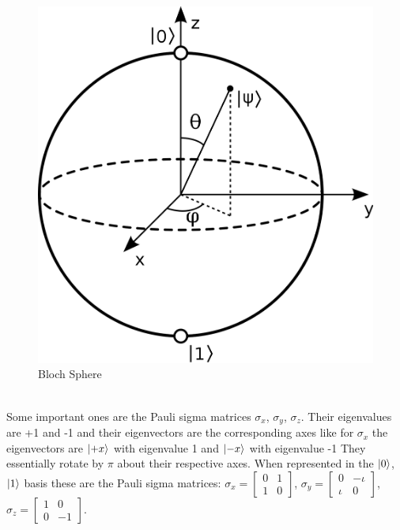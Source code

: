 \documentclass{report}
\begin{document}
\begin{figure}[ht]
    \centering
    \includegraphics[scale = 0.16]{images/Bloch sphere.png}
    \caption{Bloch Sphere}
    \label{fig:my_label}
\end{figure}\\
Some important ones are the Pauli sigma matrices $\sigma_x$, $\sigma_y$, $\sigma_z$. Their eigenvalues are +1 and -1 and their eigenvectors are the corresponding axes like for $\sigma_x$ the eigenvectors are $\ket{+x}$ with eigenvalue 1 and $\ket{-x}$ with eigenvalue -1
They essentially rotate by $\pi$ about their respective axes. When represented in the $\ket{0}$, $\ket{1}$ basis these are the Pauli sigma matrices:
$\sigma_x = \begin{bmatrix}0 & 1\\1 & 0\end{bmatrix}$, $\sigma_y = \begin{bmatrix}0 & -\iota\\\iota & 0\end{bmatrix}$, $\sigma_z = \begin{bmatrix}1 & 0\\0 & -1\end{bmatrix}$.\\
\end{document}
